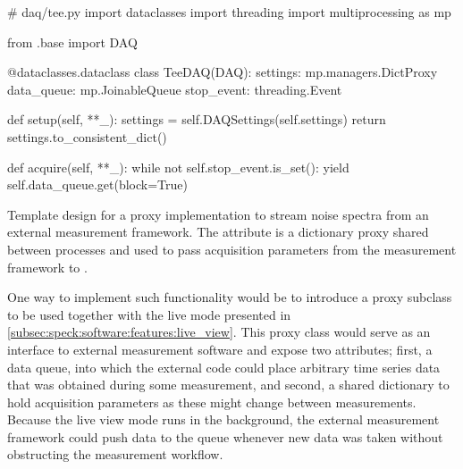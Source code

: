 \begin{marginlisting}
    \begin{py}[
        fontsize=\footnotesize,%
        breaklines,%
        breakafter=.,%
    ]
        # daq/tee.py
        import dataclasses
        import threading
        import multiprocessing as mp

        from .base import DAQ

        @dataclasses.dataclass
        class TeeDAQ(DAQ):
            settings: mp.managers.DictProxy
            data_queue: mp.JoinableQueue
            stop_event: threading.Event

            def setup(self, **_):
                settings = self.DAQSettings(self.settings)
                return settings.to_consistent_dict()

            def acquire(self, **_):
                while not self.stop_event.is_set():
                    yield self.data_queue.get(block=True)
    \end{py}
    \caption[ template]{
        Template design for a proxy  implementation to stream noise spectra from an external measurement framework.
        The  attribute is a dictionary proxy shared between processes and used to pass acquisition parameters from the measurement framework to \pyspeck.
    }
    \label{lst:speck:conclusion:tee}
\end{marginlisting}

One way to implement such functionality would be to introduce a proxy  subclass to be used together with the live mode presented in \cref{subsec:speck:software:features:live_view}.
This proxy class would serve as an interface to external measurement software and expose two attributes; first, a data queue, into which the external code could place arbitrary time series data that was obtained during some measurement, and second, a shared dictionary to hold acquisition parameters as these might change between measurements.
Because the live view mode runs in the background, the external measurement framework could push data to the queue whenever new data was taken without obstructing the measurement workflow.

